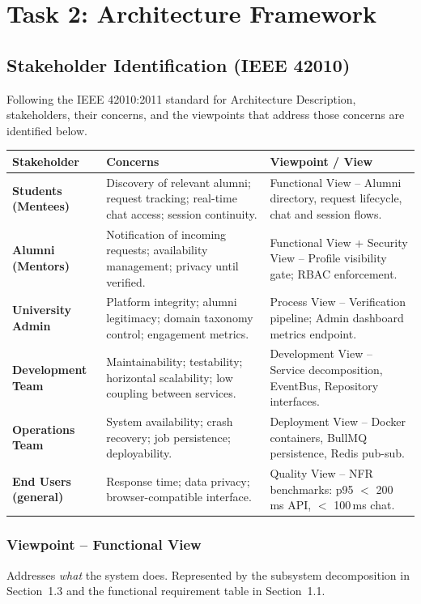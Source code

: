 \documentclass[12pt,a4paper]{article}
\begin{document}
\section{Task 2: Architecture Framework}

\subsection{Stakeholder Identification (IEEE 42010)}

Following the IEEE 42010:2011 standard for Architecture Description, stakeholders, their concerns, and the viewpoints that address those concerns are identified below.

\begin{longtable}{@{}p{2.8cm} p{3.8cm} p{5.6cm}@{}}
\toprule
\textbf{Stakeholder} & \textbf{Concerns} & \textbf{Viewpoint / View} \\
\midrule
\endhead
\textbf{Students (Mentees)} & Discovery of relevant alumni; request tracking; real-time chat access; session continuity. & Functional View -- Alumni directory, request lifecycle, chat and session flows. \\[4pt]
\textbf{Alumni (Mentors)} & Notification of incoming requests; availability management; privacy until verified. & Functional View + Security View -- Profile visibility gate; RBAC enforcement. \\[4pt]
\textbf{University Admin} & Platform integrity; alumni legitimacy; domain taxonomy control; engagement metrics. & Process View -- Verification pipeline; Admin dashboard metrics endpoint. \\[4pt]
\textbf{Development Team} & Maintainability; testability; horizontal scalability; low coupling between services. & Development View -- Service decomposition, EventBus, Repository interfaces. \\[4pt]
\textbf{Operations Team} & System availability; crash recovery; job persistence; deployability. & Deployment View -- Docker containers, BullMQ persistence, Redis pub-sub. \\[4pt]
\textbf{End Users (general)} & Response time; data privacy; browser-compatible interface. & Quality View -- NFR benchmarks: p95 $<$ 200\,ms API, $<$ 100\,ms chat. \\
\bottomrule
\end{longtable}

\subsubsection{Viewpoint -- Functional View}
Addresses \textit{what} the system does. Represented by the subsystem decomposition in Section~1.3 and the functional requirement table in Section~1.1.
\end{document}
